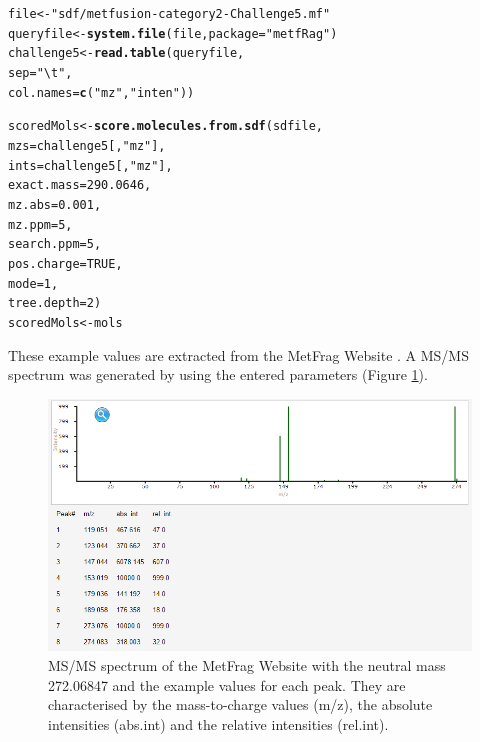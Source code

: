 \documentclass[12pt, a4paper]{scrartcl}\usepackage[]{graphicx}\usepackage[]{color}
\makeatletter
\newcommand{\hlnum}[1]{\textcolor[rgb]{0.686,0.059,0.569}{#1}}%
\newcommand{\hlstr}[1]{\textcolor[rgb]{0.192,0.494,0.8}{#1}}%
\newcommand{\hlstd}[1]{\textcolor[rgb]{0.345,0.345,0.345}{#1}}%
\newcommand{\hlkwb}[1]{\textcolor[rgb]{0.69,0.353,0.396}{#1}}%
\newcommand{\hlkwc}[1]{\textcolor[rgb]{0.333,0.667,0.333}{#1}}%
\newcommand{\hlkwd}[1]{\textcolor[rgb]{0.737,0.353,0.396}{\textbf{#1}}}%
\newenvironment{kframe}{%
 \def\at@end@of@kframe{}%
 \ifinner\ifhmode%
  \def\at@end@of@kframe{\end{minipage}}%
  \begin{minipage}{\columnwidth}%
 \fi\fi%
 \def\FrameCommand##1{\hskip\@totalleftmargin \hskip-\fboxsep
 \colorbox{shadecolor}{##1}\hskip-\fboxsep
     \hskip-\linewidth \hskip-\@totalleftmargin \hskip\columnwidth}%
 \MakeFramed {\advance\hsize-\width
   \@totalleftmargin\z@ \linewidth\hsize
   \@setminipage}}%
 {\par\unskip\endMakeFramed%
 \at@end@of@kframe}
\newenvironment{knitrout}{}{} %
\makeatother
\begin{document}
\begin{knitrout}
\color{fgcolor}\begin{kframe}
\begin{alltt}
\hlstd{file} \hlkwb{<-} \hlstr{"sdf/metfusion-category2-Challenge5.mf"}
\hlstd{queryfile} \hlkwb{<-} \hlkwd{system.file}\hlstd{(file,} \hlkwc{package} \hlstd{=} \hlstr{"metfRag"}\hlstd{)}
\hlstd{challenge5} \hlkwb{<-} \hlkwd{read.table}\hlstd{(queryfile,}
                         \hlkwc{sep}\hlstd{=}\hlstr{"\textbackslash{}t"}\hlstd{,}
                         \hlkwc{col.names}\hlstd{=}\hlkwd{c}\hlstd{(}\hlstr{"mz"}\hlstd{,} \hlstr{"inten"}\hlstd{))}

\hlstd{scoredMols} \hlkwb{<-} \hlkwd{score.molecules.from.sdf}\hlstd{(sdfile,}
                                       \hlkwc{mzs}\hlstd{=challenge5[,}\hlstr{"mz"}\hlstd{],}
                                       \hlkwc{ints}\hlstd{=challenge5[,}\hlstr{"mz"}\hlstd{],}
                                       \hlkwc{exact.mass}\hlstd{=}\hlnum{290.0646}\hlstd{,}
                                       \hlkwc{mz.abs}\hlstd{=}\hlnum{0.001}\hlstd{,}
                                       \hlkwc{mz.ppm}\hlstd{=}\hlnum{5}\hlstd{,}
                                       \hlkwc{search.ppm}\hlstd{=}\hlnum{5}\hlstd{,}
                                       \hlkwc{pos.charge}\hlstd{=}\hlnum{TRUE}\hlstd{,}
                                       \hlkwc{mode}\hlstd{=}\hlnum{1}\hlstd{,}
                                       \hlkwc{tree.depth}\hlstd{=}\hlnum{2}\hlstd{)}
\hlstd{scoredMols} \hlkwb{<-} \hlstd{mols}
\end{alltt}
\end{kframe}
\end{knitrout}

These example values are extracted from the MetFrag Website \cite{Metfrag2014}. A MS/MS spectrum was generated by using the entered parameters (Figure \ref{fragSpec}).
\newpage
\begin{figure}[h]
  \centering
  \includegraphics[scale=0.5]{./figure/Metfrag_screenshot.png}
  \caption{MS/MS spectrum of the MetFrag Website with the neutral mass 272.06847 and the example 
  values for each peak. They are characterised by the mass-to-charge values (m/z), the absolute intensities (abs.int)
  and the relative intensities (rel.int).}
  \label{fragSpec}
\end{figure}
\end{document}
